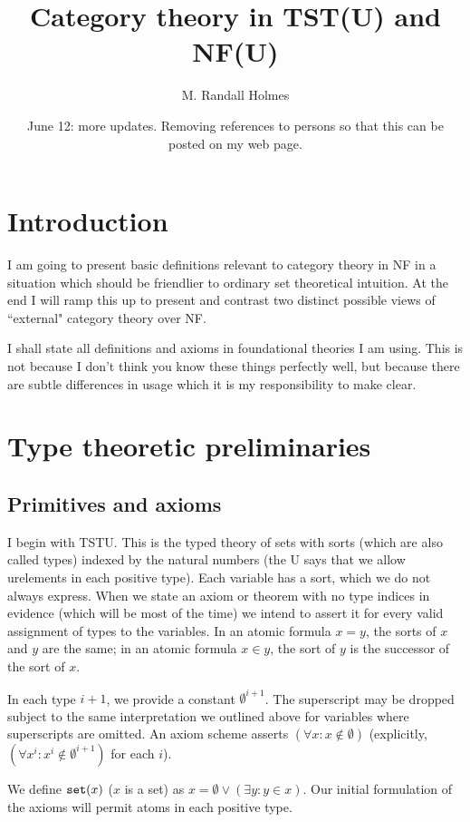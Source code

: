 \documentclass[12pt]{article}
\title{Category theory in TST(U) and NF(U)}
\author{M. Randall Holmes}
\date{June 12:  more updates.  Removing references to persons so that this can be posted on my web page.}
\begin{document}
\maketitle

\section{Introduction}

I am going to present basic definitions relevant to category theory in NF  in a situation which should be friendlier to ordinary set theoretical intuition.
At the end I will ramp this up to present and contrast two distinct possible views of ``external" category theory over NF.


I shall state all definitions and axioms in foundational theories I am using.  This is not because I don't think you know these things perfectly well, but because there are subtle differences in usage which it is my responsibility to make clear.

\section{Type theoretic preliminaries}

\subsection{Primitives and axioms}

I begin with TSTU.  This is the typed theory of sets with sorts (which are also called types) indexed by the natural numbers (the U says that we allow urelements in each positive type).  Each variable has a sort, which we do not always express.  When we
state an axiom or theorem with no type indices in evidence (which will be most of the time) we intend to assert it for every valid assignment of types to the variables.
In an atomic formula $x = y$, the sorts of $x$ and $y$ are the same;  in an atomic formula $x \in y$, the sort of $y$ is the successor of the sort of $x$.

In each type $i+1$, we provide a constant $\emptyset^{i+1}$.  The superscript may be dropped subject to the same interpretation we outlined above for variables where superscripts are omitted.  An axiom scheme asserts $(\forall x:x \not\in \emptyset)$ (explicitly,  $(\forall x^i:x^i \not\in \emptyset^{i+1})$ for each $i$).  

We define ${\tt set}(x)$ ($x$ is a set) as $x = \emptyset \vee (\exists y:y \in x)$.  Our initial formulation of the axioms will permit atoms in each positive type.
\end{document}

